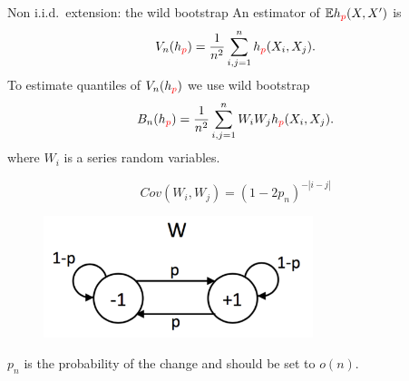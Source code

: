 \begin{frame}
\begin{columns}
\begin{column}{.33\linewidth}
\vspace{-0.75cm}
\begin{block}{Non i.i.d.\ extension: the wild bootstrap}
An estimator of $\mathbb{E} h_{\color{red} p}(X,X')$ is  
\[
 V_n(h_{\color{red} p}) = \frac {1} {n^2} \sum_{i,j=1}^n h_{\color{red} p}(X_i,X_j).
\]
To estimate quantiles of $ V_n(h_{\color{red} p})$ we use wild bootstrap
\[
 B_n(h_{\color{red} p}) = \frac {1} {n^2} \sum_{i,j=1}^n W_i W_j h_{\color{red} p}(X_i,X_j).
\]
  where $W_i$ is a  series  random variables.
\begin{center}
  \begin{minipage}{.49\linewidth}
       $$
  Cov(W_i,W_j) = (1-2p_n)^{-|i-j|}
  $$
\end{minipage}
\begin{minipage}{.49\linewidth}
 \begin{figure}
            \vspace{-0.5cm}
           \includegraphics[width=0.7\textwidth, angle =0 ]{../../presentation/img/W_graphicalModel.pdf} 
        \end{figure}
\end{minipage}
\end{center}
  $p_n$ is  the probability of the change  and should be set to $o(n)$.

\begin{center}


\end{center}
\end{block}
\end{column}
\end{columns}
\end{frame}
